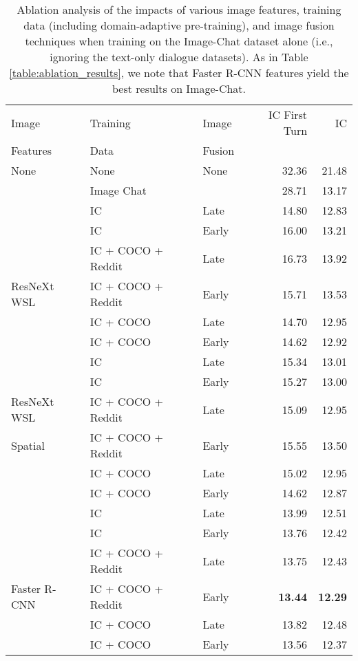 \documentclass[11pt,a4paper]{article}
\begin{document}
\begin{table*}[t!]
\begin{center}
\small
\begin{tabular}{|l|l|l|r|r| }
 \hline
Image  & Training & Image & IC First Turn & IC \\
Features & Data & Fusion & & \\
\hline
None & None & None & 32.36 & 21.48 \\ 
& Image Chat & & 28.71 & 13.17 \\ 
\hline
\hline
& IC & Late  &14.80 & 12.83 \\ 
& IC & Early  &16.00 & 13.21 \\ 
& IC + COCO + Reddit & Late & 16.73 & 13.92 \\ 
ResNeXt WSL & IC + COCO + Reddit & Early & 15.71 & 13.53 \\ 
& IC + COCO & Late & 14.70 & 12.95 \\ 
& IC + COCO & Early & 14.62 & 12.92 \\ 

\hline
\hline
& IC & Late  &15.34 & 13.01 \\ 
& IC & Early  &15.27 & 13.00 \\ 
ResNeXt WSL  & IC + COCO + Reddit & Late & 15.09 & 12.95 \\ 
 Spatial & IC + COCO + Reddit & Early & 15.55 & 13.50 \\ 
& IC + COCO & Late & 15.02 & 12.95 \\ 
& IC + COCO & Early & 14.62 & 12.87 \\ 

\hline
\hline
& IC & Late  &13.99 & 12.51 \\ 
& IC & Early  &13.76 & 12.42 \\ 
& IC + COCO + Reddit & Late & 13.75 & 12.43 \\ 
Faster R-CNN & IC + COCO + Reddit & Early & \textbf{13.44} & \textbf{12.29} \\ 
& IC + COCO & Late & 13.82 & 12.48 \\
& IC + COCO & Early & 13.56 & 12.37 \\ 

 \hline
\end{tabular}
\caption{Ablation analysis of the impacts of various image features, training data (including domain-adaptive pre-training), and image fusion techniques when training on the Image-Chat dataset alone (i.e., ignoring the text-only dialogue datasets). As in Table \ref{table:ablation_results}, we note that Faster R-CNN features yield the best results on Image-Chat.
\label{table:ablation_results_ic}
}
\end{center}
\end{table*}
\end{document}
